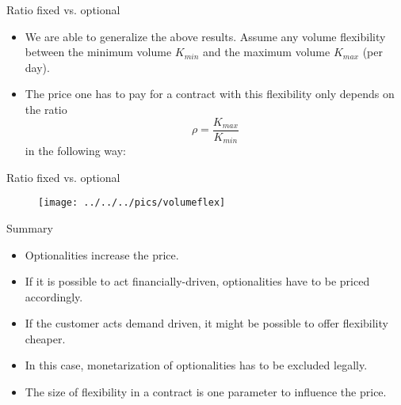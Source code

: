 

{Ratio fixed vs. optional}
\begin{itemize}
\item<1-> We are able to generalize the above results. Assume any volume flexibility between the minimum volume $K_{min}$ and the maximum volume $K_{max}$ (per day).
\item<2-> The price one has to pay for a contract with this flexibility only depends on the ratio
$$
	\rho = \frac{K_{max}}{K_{min}}
$$
in the following way:
\end{itemize}



{Ratio fixed vs. optional}
\begin{figure}
	\centering
		\texttt{[image: ../../../pics/volumeflex]}
	\label{fig:volumeflex}
\end{figure}



{Summary}
\begin{itemize}
\item<1-> Optionalities increase the price.
\item<2-> If it is possible to act financially-driven, optionalities have to be priced accordingly.
\item<3-> If the customer acts demand driven, it might be possible to offer flexibility cheaper.
\item<4-> In this case, monetarization of optionalities has to be excluded legally.
\item<5-> The size of flexibility in a contract is one parameter to influence the price.
\end{itemize}








